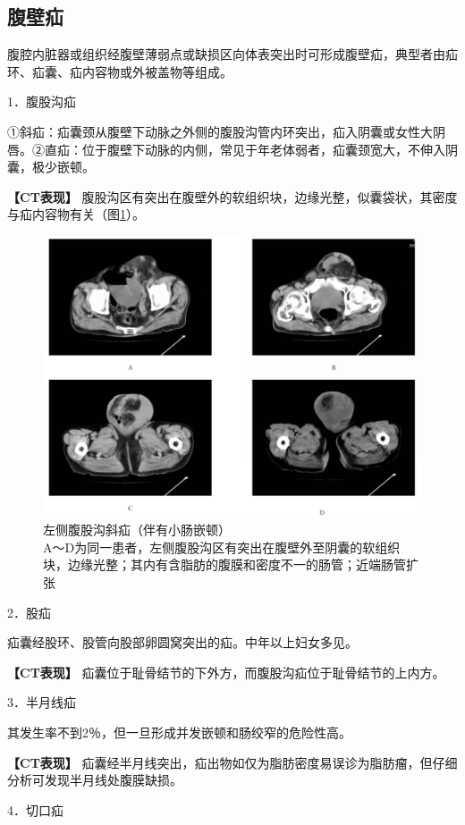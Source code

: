 \subsection{腹壁疝}

腹腔内脏器或组织经腹壁薄弱点或缺损区向体表突出时可形成腹壁疝，典型者由疝环、疝囊、疝内容物或外被盖物等组成。

1．腹股沟疝

①斜疝：疝囊颈从腹壁下动脉之外侧的腹股沟管内环突出，疝入阴囊或女性大阴唇。②直疝：位于腹壁下动脉的内侧，常见于年老体弱者，疝囊颈宽大，不伸入阴囊，极少嵌顿。

\textbf{【CT表现】}
腹股沟区有突出在腹壁外的软组织块，边缘光整，似囊袋状，其密度与疝内容物有关（图\ref{fig18-9}）。

\begin{figure}[!htbp]
 \centering
 \includegraphics[width=.7\textwidth,height=\textheight,keepaspectratio]{./images/Image00379.jpg}
 \captionsetup{justification=centering}
 \caption{左侧腹股沟斜疝（伴有小肠嵌顿）\\{\small A～D为同一患者，左侧腹股沟区有突出在腹壁外至阴囊的软组织块，边缘光整；其内有含脂肪的腹膜和密度不一的肠管；近端肠管扩张}}
 \label{fig18-9}
  \end{figure} 

2．股疝

疝囊经股环、股管向股部卵圆窝突出的疝。中年以上妇女多见。

\textbf{【CT表现】}
疝囊位于耻骨结节的下外方，而腹股沟疝位于耻骨结节的上内方。

3．半月线疝

其发生率不到2％，但一旦形成并发嵌顿和肠绞窄的危险性高。

\textbf{【CT表现】}
疝囊经半月线突出，疝出物如仅为脂肪密度易误诊为脂肪瘤，但仔细分析可发现半月线处腹膜缺损。

4．切口疝

